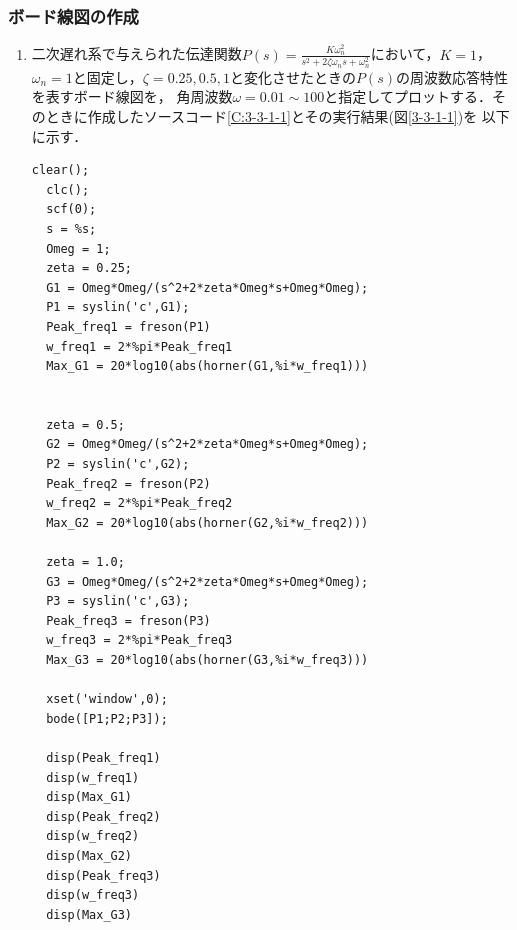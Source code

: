 \documentclass[a4paper,11pt]{jsarticle}
\begin{document}
    \subsubsection{ボード線図の作成}
    \begin{enumerate}
      \item 
      二次遅れ系で与えられた伝達関数$P(s)=\frac{K\omega^2_n}{s^2+2\zeta\omega_ns+\omega^2_n}$において，$K=1$，
      $\omega_n=1$と固定し，$\zeta=0.25,0.5,1$と変化させたときの$P(s)$の周波数応答特性を表すボード線図を，
      角周波数$\omega=0.01 \sim 100$と指定してプロットする．そのときに作成したソースコード\ref{C:3-3-1-1}とその実行結果(図\ref{3-3-1-1})を
      以下に示す．
      \begin{lstlisting}[caption=C:3-3-1-1]
  clear();
  clc();
  scf(0);
  s = %s;
  Omeg = 1;
  zeta = 0.25;
  G1 = Omeg*Omeg/(s^2+2*zeta*Omeg*s+Omeg*Omeg);
  P1 = syslin('c',G1);
  Peak_freq1 = freson(P1)
  w_freq1 = 2*%pi*Peak_freq1
  Max_G1 = 20*log10(abs(horner(G1,%i*w_freq1)))


  zeta = 0.5;
  G2 = Omeg*Omeg/(s^2+2*zeta*Omeg*s+Omeg*Omeg);
  P2 = syslin('c',G2);
  Peak_freq2 = freson(P2)
  w_freq2 = 2*%pi*Peak_freq2
  Max_G2 = 20*log10(abs(horner(G2,%i*w_freq2)))

  zeta = 1.0;
  G3 = Omeg*Omeg/(s^2+2*zeta*Omeg*s+Omeg*Omeg);
  P3 = syslin('c',G3);
  Peak_freq3 = freson(P3)
  w_freq3 = 2*%pi*Peak_freq3
  Max_G3 = 20*log10(abs(horner(G3,%i*w_freq3)))

  xset('window',0);
  bode([P1;P2;P3]);

  disp(Peak_freq1)
  disp(w_freq1)
  disp(Max_G1)
  disp(Peak_freq2)
  disp(w_freq2)
  disp(Max_G2)
  disp(Peak_freq3)
  disp(w_freq3)
  disp(Max_G3)


\end{lstlisting}
\end{enumerate}
\end{document}
